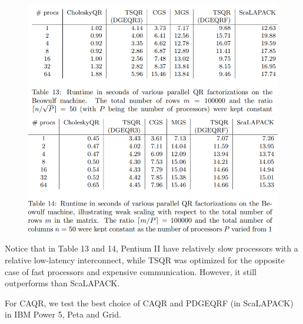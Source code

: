 \documentclass{article}
\begin{document}
\begin{figure}[htbp]
	\centering
	\includegraphics[scale=.6]{TSQR_res1.png}
	\includegraphics[scale=.6]{TSQR_res2.png}
\end{figure}
Notice that in Table 13 and 14,  Pentium II have relatively slow processors with a relative low-latency interconnect, while TSQR was optimized for the opposite case of fast processors and expensive communication. However, it still outperforms than ScaLAPACK.

For CAQR, we test the best choice of CAQR and PDGEQRF (in ScaLAPACK) in IBM Power 5, Peta and Grid.
\end{document}
